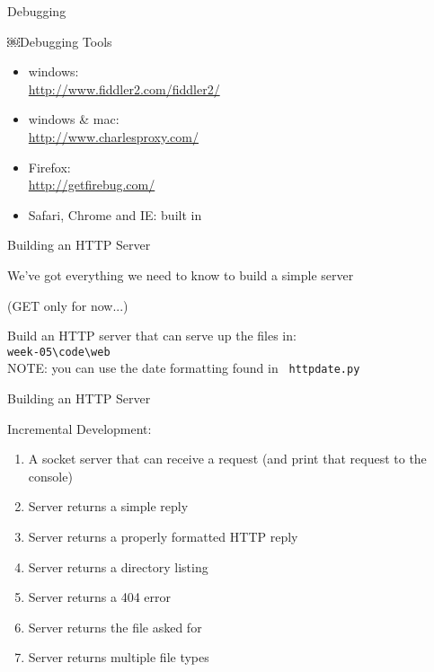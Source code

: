 \documentclass{beamer}
\begin{document}
\begin{frame}[fragile]{Debugging}

{\Large￼Debugging Tools}

\begin{itemize}
  \item windows:\\
    \url{http://www.fiddler2.com/fiddler2/}
  \item windows \& mac:\\
    \url{http://www.charlesproxy.com/}
  \item Firefox:\\ 
    \url{http://getfirebug.com/}
  \item Safari, Chrome and IE: built in
\end{itemize}

\end{frame}


\begin{frame}[fragile]{Building an HTTP Server}

\vfill
{\Large We've got everything we need to know to build a simple server}

\vfill
(GET only for now...)

\vfill
{\Large Build an HTTP server that can serve up the files in: \\[0.1in]
\verb|week-05\code\web|}\\

\vfill
NOTE: you can use the date formatting found in \verb| httpdate.py |
\end{frame}



\begin{frame}{Building an HTTP Server}

{\Large Incremental Development:}
\begin{enumerate}
  \item A socket server that can receive a request (and print that request to the console)
  \item Server returns a simple reply
  \item Server returns a properly formatted HTTP reply
  \item Server returns a directory listing
  \item Server returns a 404 error
  \item Server returns the file asked for
  \item Server returns multiple file types
\end{enumerate}

\end{frame}
\end{document}
